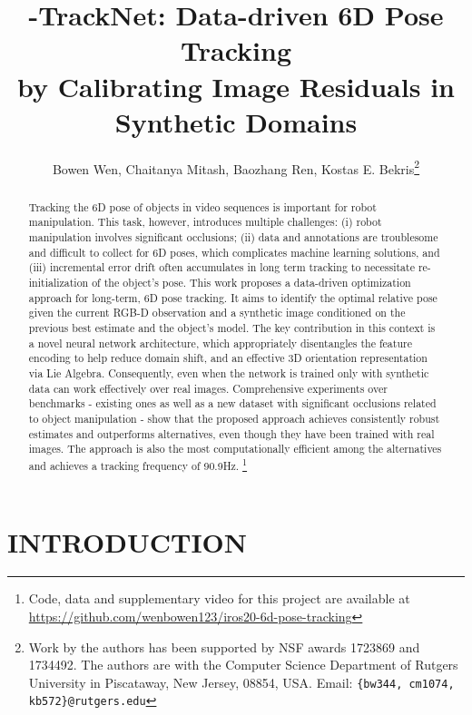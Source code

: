 \documentclass[letterpaper, 10 pt, conference]{ieeeconf}
\title{\LARGE \bf -TrackNet: Data-driven 6D Pose Tracking\\
by Calibrating Image Residuals in Synthetic Domains}
\author{Bowen Wen, Chaitanya Mitash, Baozhang Ren, Kostas E. Bekris\thanks{Work by the authors has been supported by NSF awards 1723869 and 1734492. The authors are with the Computer Science Department of Rutgers University in Piscataway, New Jersey, 08854, USA. Email: {\tt\small \{bw344, cm1074, kb572\}@rutgers.edu}}}
\begin{document}


\maketitle
\thispagestyle{empty}
\pagestyle{empty}


\begin{abstract}
Tracking the 6D pose of objects in video sequences is important for  robot manipulation. This  task, however, introduces multiple challenges: (i) robot manipulation involves significant occlusions; (ii) data and annotations are troublesome and difficult to collect for 6D poses, which complicates machine learning solutions, and (iii) incremental error drift often accumulates in long term tracking to necessitate re-initialization of the object's pose. This work proposes a data-driven optimization approach for long-term, 6D pose tracking. It aims to identify the optimal relative pose given the current RGB-D observation and a synthetic image conditioned on the previous best estimate and the object's model. The key contribution in this context is a novel neural network architecture, which appropriately disentangles the feature encoding to help reduce domain shift, and an effective 3D orientation representation via Lie Algebra. Consequently, even when the network is trained only with synthetic data can work effectively over real images. Comprehensive experiments over benchmarks - existing ones as well as a new dataset with significant occlusions related to object manipulation - show that the proposed approach achieves consistently robust estimates and outperforms alternatives, even though they have been trained with real images. The approach is also the most computationally efficient among the alternatives and achieves a tracking frequency of 90.9Hz. \footnote{Code, data and supplementary video for this project are available at \href{https://github.com/wenbowen123/iros20-6d-pose-tracking}{https://github.com/wenbowen123/iros20-6d-pose-tracking}} \end{abstract}


\section{INTRODUCTION}
\end{document}
